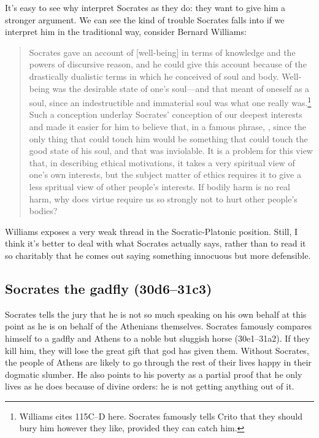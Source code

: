 \documentclass[11pt]{article}
\begin{document}
It's easy to see why \citeauthor{brickhousesmith2004} interpret Socrates as they do: they want to give him a stronger argument.  We can see the kind of trouble Socrates falls into if we interpret him in the traditional way, consider Bernard Williams:

\begin{quote}
    Socrates gave an account of [well-being] in terms of knowledge and the powers of discursive reason, and he could give this account because of the drastically dualistic terms in which he conceived of soul and body.  Well-being was the desirable state of one's soul---and that meant of oneself as a soul, since an indestructible and immaterial soul was what one really was.\footnote{Williams cites  115C--D here.  Socrates famously tells Crito that they should bury him however they like, provided they can catch him.}  Such a conception underlay Socrates' conception of our deepest interests and made it easier for him to believe that, in a famous phrase, , since the only thing that could touch him would be something that could touch the good state of his soul, and that was inviolable.  It is a problem for this view that, in describing ethical motivations, it takes a very spiritual view of one's own interests, but the subject matter of ethics requires it to give a less spritual view of other people's interests. If bodily harm is no real harm, why does virtue require us so strongly not to hurt other people's bodies?  \citep[34]{williams1985}
\end{quote}

Williams exposes a very weak thread in the Socratic-Platonic position.  Still, I think it's better to deal with what Socrates actually says, rather than to read it so charitably that he comes out saying something innocuous but more defensible.


\subsection{Socrates the gadfly (30d6--31c3)}

Socrates tells the jury that he is not so much speaking on his own behalf at this point as he is on behalf of the Athenians themselves.  Socrates famously compares himself to a gadfly and Athens to a noble but sluggish horse (30e1--31a2).  If they kill him, they will lose the great gift that god has given them.  Without Socrates, the people of Athens are likely to go through the rest of their lives happy in their dogmatic slumber.  He also points to his poverty as a partial proof that he only lives as he does because of divine orders: he is not getting anything out of it.
\end{document}
